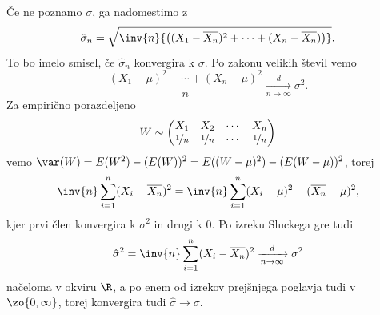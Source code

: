 Če ne poznamo $\sigma$, ga nadomestimo z 
\[
  \hat{\sigma}_n = \sqrt{
	\inv{n} {\left( (X_1 - \overline{X_n})^2 + \cdots + (X_n - \overline{X_n})
	  \right)}
  }.
\]
To bo imelo smisel, če $\hat{\sigma}_n$ konvergira k $\sigma$.
Po zakonu velikih števil vemo
\[
  \frac{(X_1 - \mu)^2 + \cdots + (X_n -\mu)^2}{n}
  \xrightarrow[n \to \infty]{d} \sigma^2.
\]
Za empirično porazdeljeno
\[
  W \sim
  \begin{pmatrix}
	X_1 & X_2 & \cdots & X_n \\
	\nicefrac{1}{n} & \nicefrac{1}{n} & \cdots & \nicefrac{1}{n}
  \end{pmatrix}
\]
vemo $\var(W) = E(W^2) - (E(W))^2 = E((W - \mu)^2) - (E(W - \mu))^2$, torej
\[
  \inv{n} \sum_{i=1}^n (X_i - \overline{X_n})^2 = \inv{n} \sum_{i=1}^n (X_i -
  \mu)^2 - (\overline{X_n} - \mu)^2,
\]
kjer prvi člen konvergira k $\sigma^2$ in drugi k $0$.
Po izreku Sluckega gre tudi
\[
  \hat{\sigma}^2 = \inv{n} \sum_{i=1}^n (X_i - \overline{X_n})^2
  \xrightarrow[n \to \infty]{d} \sigma^2
\]
načeloma v okviru $\R$, a po enem od izrekov prejšnjega poglavja tudi v $\zo{0,
  \infty}$, torej konvergira tudi $\hat{\sigma} \to \sigma$.


